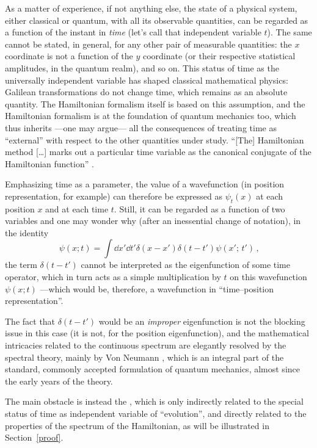 As a matter of experience, if not anything else,
the state of a physical system, either classical or quantum,
with all its observable quantities,
can be regarded as a function of the instant in \emph{time}
(let's call that independent variable $t$).
The same cannot be stated, in general, for any other pair of measurable quantities:
the $x$ coordinate is not a function of the $y$ coordinate
(or their respective statistical amplitudes, in the quantum realm),
and so on.
This status of time as the universally independent variable
has shaped classical mathematical physics: Galilean transformations
do not change time, which remains as an absolute quantity.
The Hamiltonian formalism itself is based on this assumption,
and the Hamiltonian formalism is at the foundation of quantum mechanics too,
which thus inherits ---one may argue--- all the consequences of
treating time as ``external'' with respect to the other quantities under study.
``[The] Hamiltonian method [\dots] marks out a particular time variable
as the canonical conjugate of the Hamiltonian function'' \parencite{DiracLagrangian}.

Emphasizing time as a parameter, the value of a wavefunction
(in position representation, for example)
can therefore be expressed as $\psi_{t}(x)$ at each position $x$
and at each time $t$.
Still, it can be regarded as a function of two variables
and one may wonder why (after an inessential change of notation),
in the identity
\begin{equation}\label{eq:diracdeltaxt}
  \psi(x; t) = \int \dd{x'}\dd{t'} \delta(x-x')\delta(t-t') \psi(x';\, t') \,\text{,}
\end{equation}
the term $\delta(t-t')$ cannot be interpreted as the eigenfunction of some time operator,
which in turn acts as a simple multiplication by $t$ on this
wavefunction $\psi(x; t)$ ---which would be, therefore, a wavefunction in ``time--position representation''.

The fact that $\delta(t-t')$ would be an \emph{improper} eigenfunction
is not the blocking issue in this case (it is not, for the position eigenfunction),
and the mathematical intricacies related to the continuous spectrum are
elegantly resolved by the spectral theory, mainly by Von Neumann
\parencite{VonNeumann}, which is an integral part of the standard, commonly accepted
formulation of quantum mechanics, almost since the early years of the theory.

The main obstacle is instead the ,
which is only indirectly related to the special status of time
as independent variable of ``evolution'', and
directly related to the properties of the spectrum of the {Hamiltonian},
as will be illustrated in Section~\ref{proof}.

